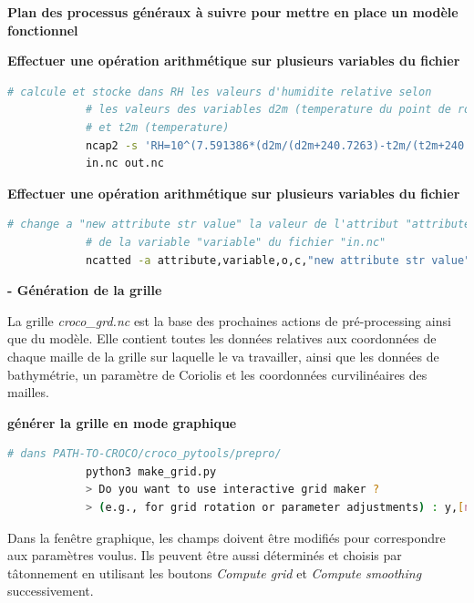 \documentclass[10pt,a4paper,titlepage]{article}
\begin{document}
\begin{processEnv}{\textbf{Plan des processus généraux à suivre pour mettre en place un modèle fonctionnel}}
    \begin{codeEnv}{\textbf{Effectuer une opération arithmétique sur plusieurs variables du fichier}}
        \begin{lstlisting}[language=bash]
            # calcule et stocke dans RH les valeurs d'humidite relative selon
            # les valeurs des variables d2m (temperature du point de rosee)
            # et t2m (temperature)
            ncap2 -s 'RH=10^(7.591386*(d2m/(d2m+240.7263)-t2m/(t2m+240.7263)))'\
            in.nc out.nc
        \end{lstlisting}
    \end{codeEnv}

    \begin{codeEnv}{\textbf{Effectuer une opération arithmétique sur plusieurs variables du fichier}}
        \begin{lstlisting}[language=bash]
            # change a "new attribute str value" la valeur de l'attribut "attribute"
            # de la variable "variable" du fichier "in.nc"
            ncatted -a attribute,variable,o,c,"new attribute str value" in.nc
        \end{lstlisting}
    \end{codeEnv}

    \textbf{- Génération de la grille}

    La grille \textit{croco\_grd.nc} est la base des prochaines actions de pré-processing ainsi que du modèle. Elle contient toutes les données relatives aux coordonnées de chaque maille de la grille sur laquelle le va travailler, ainsi que les données de bathymétrie, un paramètre de Coriolis et les coordonnées curvilinéaires des mailles.

    \begin{codeEnv}{\textbf{générer la grille en mode graphique}}
        \begin{lstlisting}[language=bash]
            # dans PATH-TO-CROCO/croco_pytools/prepro/
            python3 make_grid.py
            > Do you want to use interactive grid maker ?
            > (e.g., for grid rotation or parameter adjustments) : y,[n] y
        \end{lstlisting}
    \end{codeEnv}

    Dans la fenêtre graphique, les champs doivent être modifiés pour correspondre aux paramètres voulus. Ils peuvent être aussi déterminés et choisis par tâtonnement en utilisant les boutons \textit{Compute grid} et \textit{Compute smoothing} successivement.


\end{processEnv}
\end{document}

